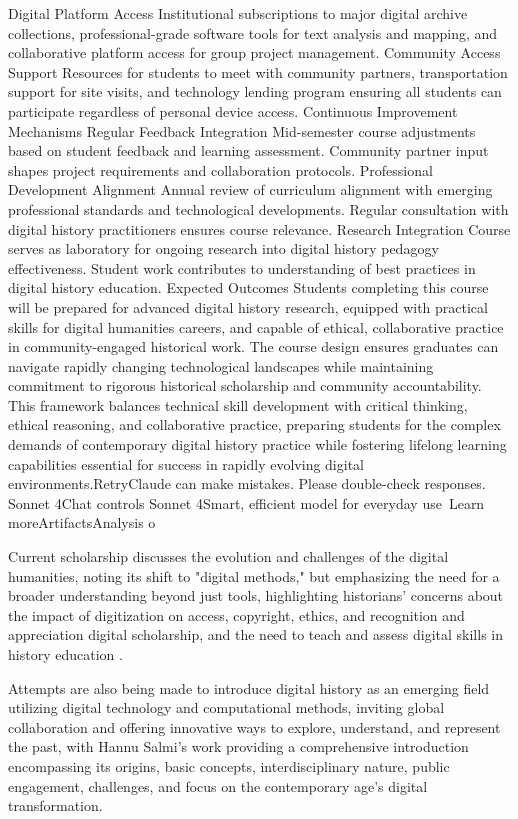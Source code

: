 Digital Platform Access
Institutional subscriptions to major digital archive collections, professional-grade software tools for text analysis and mapping, and collaborative platform access for group project management.
Community Access Support
Resources for students to meet with community partners, transportation support for site visits, and technology lending program ensuring all students can participate regardless of personal device access.
Continuous Improvement Mechanisms
Regular Feedback Integration
Mid-semester course adjustments based on student feedback and learning assessment. Community partner input shapes project requirements and collaboration protocols.
Professional Development Alignment
Annual review of curriculum alignment with emerging professional standards and technological developments. Regular consultation with digital history practitioners ensures course relevance.
Research Integration
Course serves as laboratory for ongoing research into digital history pedagogy effectiveness. Student work contributes to understanding of best practices in digital history education.
Expected Outcomes
Students completing this course will be prepared for advanced digital history research, equipped with practical skills for digital humanities careers, and capable of ethical, collaborative practice in community-engaged historical work. The course design ensures graduates can navigate rapidly changing technological landscapes while maintaining commitment to rigorous historical scholarship and community accountability.
This framework balances technical skill development with critical thinking, ethical reasoning, and collaborative practice, preparing students for the complex demands of contemporary digital history practice while fostering lifelong learning capabilities essential for success in rapidly evolving digital environments.RetryClaude can make mistakes. Please double-check responses. Sonnet 4Chat controls Sonnet 4Smart, efficient model for everyday use Learn moreArtifactsAnalysis o

Current scholarship discusses the evolution and challenges of the digital humanities, noting its shift to "digital methods," but emphasizing the need for a broader understanding beyond just tools, highlighting historians' concerns about the impact of digitization on access, copyright, ethics, and recognition and appreciation digital scholarship, and the need to teach and assess digital skills in history education \cite{Brennan}.
    
Attempts are also being made to introduce digital history as an emerging field utilizing digital technology and computational methods, inviting global collaboration and offering innovative ways to explore, understand, and represent the past, with Hannu Salmi's work providing a comprehensive introduction encompassing its origins, basic concepts, interdisciplinary nature, public engagement, challenges, and focus on the contemporary age's digital transformation. \cite{salmi}

